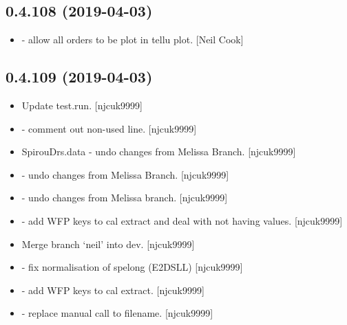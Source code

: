 \documentclass[a4paper,10pt,english]{report}
\begin{document}
\subsection{0.4.108 (2019-04-03)}
\label{\detokenize{misc/changelog:id151}}\begin{itemize}
\item {} 
 - allow all orders to be plot in tellu plot. {[}Neil Cook{]}

\end{itemize}


\subsection{0.4.109 (2019-04-03)}
\label{\detokenize{misc/changelog:id152}}\begin{itemize}
\item {} 
Update test.run. {[}njcuk9999{]}

\item {} 
 - comment out non-used line. {[}njcuk9999{]}

\item {} 
SpirouDrs.data - undo changes from Melissa Branch. {[}njcuk9999{]}

\item {} 
 - undo changes from Melissa Branch. {[}njcuk9999{]}

\item {} 
 - undo changes from Melissa branch.
{[}njcuk9999{]}

\item {} 
 - add WFP keys to cal extract and deal with
not having values. {[}njcuk9999{]}

\item {} 
Merge branch ‘neil’ into dev. {[}njcuk9999{]}

\item {} 
 - fix normalisation of spelong (E2DSLL) {[}njcuk9999{]}

\item {} 
 - add WFP keys to cal extract. {[}njcuk9999{]}

\item {} 
 - replace manual call to filename.
{[}njcuk9999{]}

\end{itemize}
\end{document}

